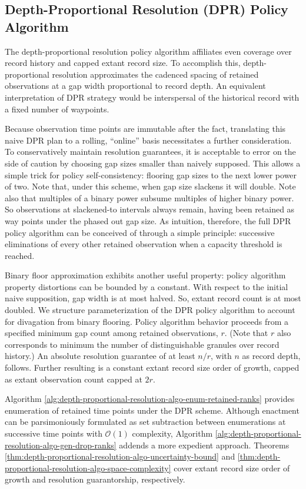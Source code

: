 \subsection{Depth-Proportional Resolution (DPR) Policy Algorithm}
\label{sec:depth-proportional-resolution-algo}

The depth-proportional resolution policy algorithm affiliates even coverage over record history and capped extant record size.
To accomplish this, depth-proportional resolution approximates the cadenced spacing of retained observations at a gap width proportional to record depth.
An equivalent interpretation of DPR strategy would be interspersal of the historical record with a fixed number of waypoints.

Because observation time points are immutable after the fact, translating this naive DPR plan to a rolling, ``online'' basis necessitates a further consideration.
To conservatively maintain resolution guarantees, it is acceptable to error on the side of caution by choosing gap sizes smaller than naively supposed.
This allows a simple trick for policy self-consistency: flooring gap sizes to the next lower power of two.
Note that, under this scheme, when gap size slackens it will double.
Note also that multiples of a binary power subsume multiples of higher binary power.
So observations at slackened-to intervals always remain, having been retained as way points under the phased out gap size.
As intuition, therefore, the full DPR policy algorithm can be conceived of through a simple principle: successive eliminations of every other retained observation when a capacity threshold is reached.

Binary floor approximation exhibits another useful property: policy algorithm property distortions can be bounded by a constant.
With respect to the initial naive supposition, gap width is at most halved.
So, extant record count is at most doubled.
We structure parameterization of the DPR policy algorithm to account for divagation from binary flooring.
Policy algorithm behavior proceeds from a specified minimum gap count among retained observations, $r$.
(Note that $r$ also corresponds to minimum the number of distinguishable granules over record history.)
An absolute resolution guarantee of at least $n/r$, with $n$ as record depth, follows.
Further resulting is a constant extant record size order of growth, capped as extant observation count capped at $2r$.

Algorithm \ref{alg:depth-proportional-resolution-algo-enum-retained-ranks} provides enumeration of retained time points under the DPR scheme.
Although enactment can be parsimoniously formulated as set subtraction between enumerations at successive time points with $\mathcal{O}(1)$ complexity, Algorithm \ref{alg:depth-proportional-resolution-algo-gen-drop-ranks} addends a more expedient approach.
Theorems \ref{thm:depth-proportional-resolution-algo-uncertainty-bound} and \ref{thm:depth-proportional-resolution-algo-space-complexity} cover extant record size order of growth and resolution guarantorship, respectively.

